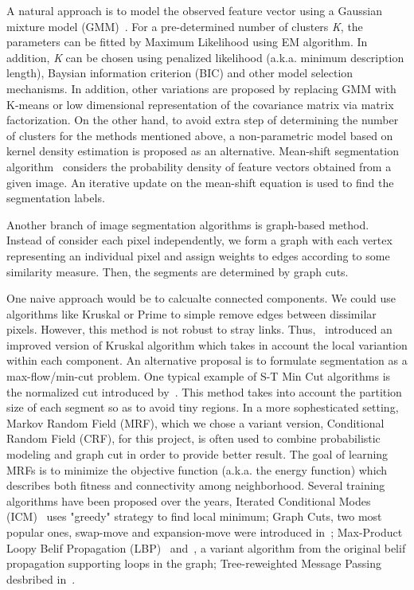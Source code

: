\documentclass{article} %
\begin{document}
A natural approach is to model the observed feature vector using a Gaussian mixture model (GMM)~\citep{Carson2002bolbworld}. For a pre-determined number of clusters \textit{K}, the parameters can be fitted by Maximum Likelihood using EM algorithm. In addition, \textit{K} can be chosen using penalized likelihood (a.k.a. minimum description length), Baysian information criterion (BIC) and other model selection mechanisms. In addition, other variations are proposed by replacing GMM with K-means or low dimensional representation of the covariance matrix via matrix factorization. On the other hand, to avoid extra step of determining the number of clusters for the methods mentioned above, a non-parametric model based on kernel density estimation is proposed as an alternative. Mean-shift segmentation algorithm~\citep{Comaniciu2002robustapproach} considers the probability density of feature vectors obtained from a given image. An iterative update on the mean-shift equation is used to find the segmentation labels. 

Another branch of image segmentation algorithms is graph-based method. Instead of consider each pixel independently, we form a graph with each vertex representing an individual pixel and assign weights to edges according to some similarity measure. Then, the segments are determined by graph cuts.

One naive approach would be to calcualte connected components. We could use algorithms like Kruskal or Prime to simple remove edges between dissimilar pixels. However, this method is not robust to stray links. Thus,~\citet{Felzenszwalb2004Efficient} introduced an improved version of Kruskal algorithm which takes in account the local variantion within each component. An alternative proposal is to formulate segmentation as a max-flow/min-cut problem. One typical example of S-T Min Cut algorithms is the normalized cut introduced by~\citet{Shi2000Normalized}. This method takes into account the partition size of each segment so as to avoid tiny regions. In a more sophesticated setting, Markov Random Field (MRF), which we chose a variant version, Conditional Random Field (CRF), for this project, is often used to combine probabilistic modeling and graph cut in order to provide better result. The goal of learning MRFs is to minimize the objective function (a.k.a. the energy function) which describes both fitness and connectivity among neighborhood. Several training algorithms have been proposed over the years, Iterated Conditional Modes (ICM)~\citep{Besag1986statisticalanalysis} uses "greedy" strategy to find local minimum; Graph Cuts, two most popular ones, swap-move and expansion-move were introduced in~\citet{Boykov2001Fast}; Max-Product Loopy Belif Propagation (LBP)~\citep{Felzenszwalb2004Efficient} and~\citep{Freeman2000lowlevel}, a variant algorithm from the original belif propagation supporting loops in the graph; Tree-reweighted Message Passing desbribed in~\citet{Kolmogorov2006messagepassing}.
\end{document}
